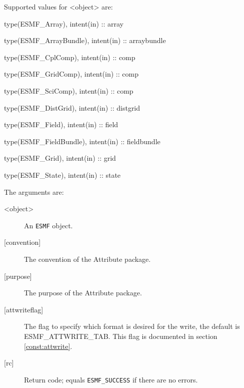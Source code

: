    Supported values for <object> are:
   \begin{description}
   \item type(ESMF\_Array), intent(in) :: array
   \item type(ESMF\_ArrayBundle), intent(in) :: arraybundle
   \item type(ESMF\_CplComp), intent(in) :: comp
   \item type(ESMF\_GridComp), intent(in) :: comp
   \item type(ESMF\_SciComp), intent(in) :: comp
   \item type(ESMF\_DistGrid), intent(in) :: distgrid
   \item type(ESMF\_Field), intent(in) :: field
   \item type(ESMF\_FieldBundle), intent(in) :: fieldbundle
   \item type(ESMF\_Grid), intent(in) :: grid
   \item type(ESMF\_State), intent(in) :: state
   \end{description}
  
   The arguments are:
   \begin{description}
   \item [<object>]
   An {\tt ESMF} object.
   \item [{[convention]}]
   The convention of the Attribute package.
   \item [{[purpose]}]
   The purpose of the Attribute package.
   \item [{[attwriteflag]}]
   The flag to specify which format is desired for the write, the
   default is ESMF\_ATTWRITE\_TAB. This flag is documented in
   section \ref{const:attwrite}.
   \item [{[rc]}]
   Return code; equals {\tt ESMF\_SUCCESS} if there are no errors.
   \end{description}
  
\setlength{\parskip}{\oldparskip}
\setlength{\parindent}{\oldparindent}
\setlength{\baselineskip}{\oldbaselineskip}
